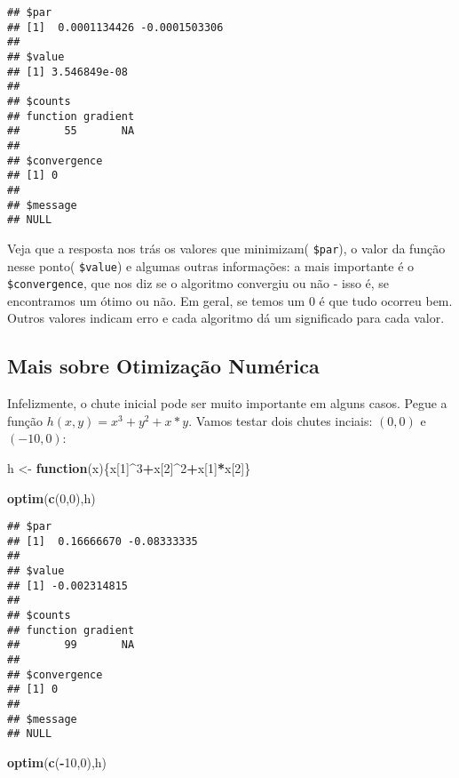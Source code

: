 \documentclass[
]{book}
\newenvironment{Shaded}{\begin{snugshade}}{\end{snugshade}}
\newcommand{\ControlFlowTok}[1]{\textcolor[rgb]{0.13,0.29,0.53}{\textbf{#1}}}
\newcommand{\DecValTok}[1]{\textcolor[rgb]{0.00,0.00,0.81}{#1}}
\newcommand{\KeywordTok}[1]{\textcolor[rgb]{0.13,0.29,0.53}{\textbf{#1}}}
\newcommand{\NormalTok}[1]{#1}
\newcommand{\OperatorTok}[1]{\textcolor[rgb]{0.81,0.36,0.00}{\textbf{#1}}}
\newcommand{\StringTok}[1]{\textcolor[rgb]{0.31,0.60,0.02}{#1}}
\begin{document}
\begin{verbatim}
## $par
## [1]  0.0001134426 -0.0001503306
## 
## $value
## [1] 3.546849e-08
## 
## $counts
## function gradient 
##       55       NA 
## 
## $convergence
## [1] 0
## 
## $message
## NULL
\end{verbatim}

Veja que a resposta nos trás os valores que minimizam( \texttt{\$par}), o valor da função nesse ponto( \texttt{\$value}) e algumas outras informações: a mais importante é o \texttt{\$convergence}, que nos diz se o algoritmo convergiu ou não - isso é, se encontramos um ótimo ou não. Em geral, se temos um 0 é que tudo ocorreu bem. Outros valores indicam erro e cada algoritmo dá um significado para cada valor.

\hypertarget{mais-sobre-otimizauxe7uxe3o-numuxe9rica}{%
\subsection{Mais sobre Otimização Numérica}\label{mais-sobre-otimizauxe7uxe3o-numuxe9rica}}

Infelizmente, o chute inicial pode ser muito importante em alguns casos. Pegue a função \(h(x,y)=x^3+y^2+x*y\). Vamos testar dois chutes inciais: \((0,0)\) e \((-10,0)\):

\begin{Shaded}
\begin{Highlighting}[]
\NormalTok{h \textless{}{-}}\StringTok{ }\ControlFlowTok{function}\NormalTok{(x)\{x[}\DecValTok{1}\NormalTok{]}\OperatorTok{\^{}}\DecValTok{3}\OperatorTok{+}\NormalTok{x[}\DecValTok{2}\NormalTok{]}\OperatorTok{\^{}}\DecValTok{2}\OperatorTok{+}\NormalTok{x[}\DecValTok{1}\NormalTok{]}\OperatorTok{*}\NormalTok{x[}\DecValTok{2}\NormalTok{]\}}

\KeywordTok{optim}\NormalTok{(}\KeywordTok{c}\NormalTok{(}\DecValTok{0}\NormalTok{,}\DecValTok{0}\NormalTok{),h)}
\end{Highlighting}
\end{Shaded}

\begin{verbatim}
## $par
## [1]  0.16666670 -0.08333335
## 
## $value
## [1] -0.002314815
## 
## $counts
## function gradient 
##       99       NA 
## 
## $convergence
## [1] 0
## 
## $message
## NULL
\end{verbatim}

\begin{Shaded}
\begin{Highlighting}[]
\KeywordTok{optim}\NormalTok{(}\KeywordTok{c}\NormalTok{(}\OperatorTok{{-}}\DecValTok{10}\NormalTok{,}\DecValTok{0}\NormalTok{),h)  }
\end{Highlighting}
\end{Shaded}
\end{document}
